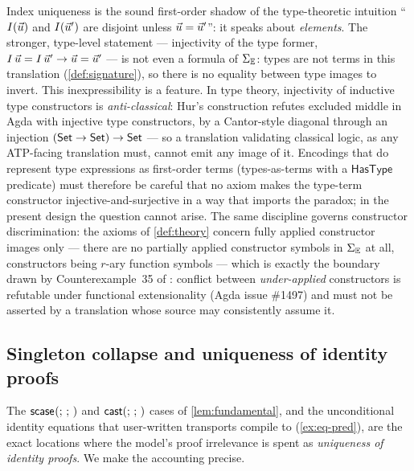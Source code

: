 \begin{remark}
\label{rem:hur}
Index uniqueness is the sound first-order shadow of the type-theoretic
intuition ``$I(\vec{u})$ and $I(\vec{u}')$ are disjoint unless $\vec{u}
= \vec{u}'$'': it speaks about \emph{elements}.  The stronger,
type-level statement --- injectivity of the type former, $I\,\vec{u} =
I\,\vec{u}' \to \vec{u} = \vec{u}'$ --- is not even a formula of
$\Sigma_{\mathbb{E}}$: types are not terms in this translation
(\cref{def:signature}), so there is no equality between type images to
invert.  This inexpressibility is a feature.  In type theory,
injectivity of inductive type constructors is \emph{anti-classical}:
Hur's construction \cite{Hur2010} refutes excluded middle in Agda with
injective type constructors, by a Cantor-style diagonal through an
injection $(\mathsf{Set} \to \mathsf{Set}) \to \mathsf{Set}$ --- so a translation validating
classical logic, as any ATP-facing translation must, cannot emit any
image of it.  Encodings that do represent type expressions as
first-order terms (types-as-terms with a $\mathsf{HasType}$ predicate)
must therefore be careful that no axiom makes the type-term constructor
injective-and-surjective in a way that imports the paradox; in the
present design the question cannot arise.  The same discipline governs
constructor discrimination: the axioms of \cref{def:theory} concern
fully applied constructor images only --- there are no partially
applied constructor symbols in $\Sigma_{\mathbb{E}}$ at all, constructors being
$r$-ary function symbols --- which is exactly the boundary drawn by
Counterexample~35 of \cite{CockxDevriese2018}: conflict between
\emph{under-applied} constructors is refutable under functional
extensionality (Agda issue \#1497) and must not be asserted by a
translation whose source may consistently assume it.
\end{remark}

\subsection{Singleton collapse and uniqueness of identity proofs}
\label{sec:formulas-uip}

The $\mathsf{scase}_{}(;\,;\,)$ and $\mathsf{cast}(;\,;\,)$ cases of
\cref{lem:fundamental}, and the unconditional identity equations that
user-written transports compile to (\cref{ex:eq-pred}), are the exact
locations where the model's proof irrelevance is spent as
\emph{uniqueness of identity proofs}.  We make the accounting precise.

